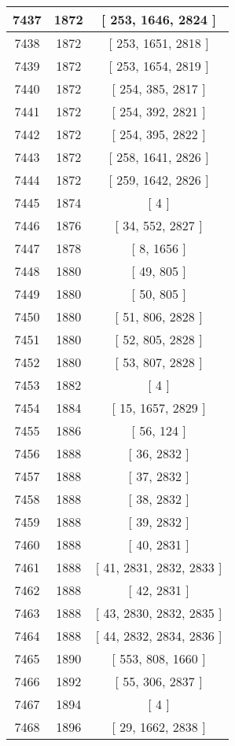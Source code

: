 \begin{center}
\begin{longtable}[H]{|| c c c ||}
\hline
7437 & 1872 & [ 253, 1646, 2824 ] \\ 
\hline
7438 & 1872 & [ 253, 1651, 2818 ] \\ 
\hline
7439 & 1872 & [ 253, 1654, 2819 ] \\ 
\hline
7440 & 1872 & [ 254, 385, 2817 ] \\ 
\hline
7441 & 1872 & [ 254, 392, 2821 ] \\ 
\hline
7442 & 1872 & [ 254, 395, 2822 ] \\ 
\hline
7443 & 1872 & [ 258, 1641, 2826 ] \\ 
\hline
7444 & 1872 & [ 259, 1642, 2826 ] \\ 
\hline
7445 & 1874 & [ 4 ] \\ 
\hline
7446 & 1876 & [ 34, 552, 2827 ] \\ 
\hline
7447 & 1878 & [ 8, 1656 ] \\ 
\hline
7448 & 1880 & [ 49, 805 ] \\ 
\hline
7449 & 1880 & [ 50, 805 ] \\ 
\hline
7450 & 1880 & [ 51, 806, 2828 ] \\ 
\hline
7451 & 1880 & [ 52, 805, 2828 ] \\ 
\hline
7452 & 1880 & [ 53, 807, 2828 ] \\ 
\hline
7453 & 1882 & [ 4 ] \\ 
\hline
7454 & 1884 & [ 15, 1657, 2829 ] \\ 
\hline
7455 & 1886 & [ 56, 124 ] \\ 
\hline
7456 & 1888 & [ 36, 2832 ] \\ 
\hline
7457 & 1888 & [ 37, 2832 ] \\ 
\hline
7458 & 1888 & [ 38, 2832 ] \\ 
\hline
7459 & 1888 & [ 39, 2832 ] \\ 
\hline
7460 & 1888 & [ 40, 2831 ] \\ 
\hline
7461 & 1888 & [ 41, 2831, 2832, 2833 ] \\ 
\hline
7462 & 1888 & [ 42, 2831 ] \\ 
\hline
7463 & 1888 & [ 43, 2830, 2832, 2835 ] \\ 
\hline
7464 & 1888 & [ 44, 2832, 2834, 2836 ] \\ 
\hline
7465 & 1890 & [ 553, 808, 1660 ] \\ 
\hline
7466 & 1892 & [ 55, 306, 2837 ] \\ 
\hline
7467 & 1894 & [ 4 ] \\ 
\hline
7468 & 1896 & [ 29, 1662, 2838 ] \\ 

\end{longtable}
\end{center}
